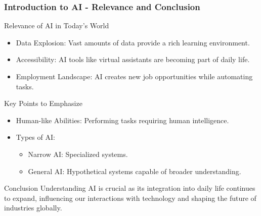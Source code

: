 \documentclass[aspectratio=169]{beamer}
\begin{document}
\begin{frame}[fragile]
    \frametitle{Introduction to AI - Relevance and Conclusion}
    \begin{block}{Relevance of AI in Today's World}
        \begin{itemize}
            \item Data Explosion: Vast amounts of data provide a rich learning environment.
            \item Accessibility: AI tools like virtual assistants are becoming part of daily life.
            \item Employment Landscape: AI creates new job opportunities while automating tasks.
        \end{itemize}
    \end{block}

    \begin{block}{Key Points to Emphasize}
        \begin{itemize}
            \item Human-like Abilities: Performing tasks requiring human intelligence.
            \item Types of AI:
            \begin{itemize}
                \item Narrow AI: Specialized systems.
                \item General AI: Hypothetical systems capable of broader understanding.
            \end{itemize}
        \end{itemize}
    \end{block}

    \begin{block}{Conclusion}
        Understanding AI is crucial as its integration into daily life continues to expand, influencing our interactions with technology and shaping the future of industries globally.
    \end{block}
\end{frame}
\end{document}
